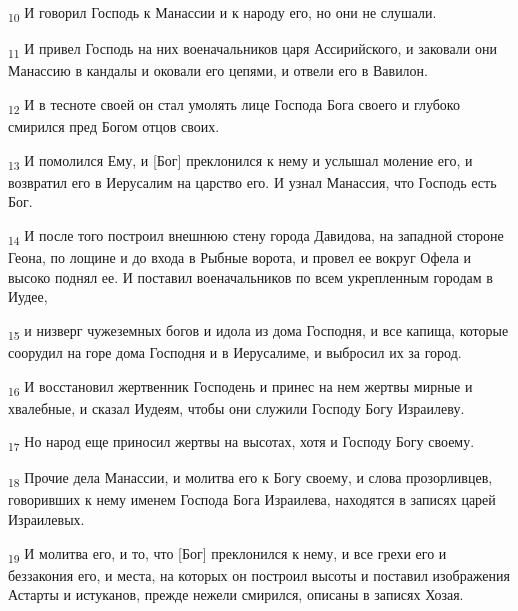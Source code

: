 \begin{tcolorbox}
\textsubscript{10} И говорил Господь к Манассии и к народу его, но они не слушали.
\end{tcolorbox}
\begin{tcolorbox}
\textsubscript{11} И привел Господь на них военачальников царя Ассирийского, и заковали они Манассию в кандалы и оковали его цепями, и отвели его в Вавилон.
\end{tcolorbox}
\begin{tcolorbox}
\textsubscript{12} И в тесноте своей он стал умолять лице Господа Бога своего и глубоко смирился пред Богом отцов своих.
\end{tcolorbox}
\begin{tcolorbox}
\textsubscript{13} И помолился Ему, и [Бог] преклонился к нему и услышал моление его, и возвратил его в Иерусалим на царство его. И узнал Манассия, что Господь есть Бог.
\end{tcolorbox}
\begin{tcolorbox}
\textsubscript{14} И после того построил внешнюю стену города Давидова, на западной стороне Геона, по лощине и до входа в Рыбные ворота, и провел ее вокруг Офела и высоко поднял ее. И поставил военачальников по всем укрепленным городам в Иудее,
\end{tcolorbox}
\begin{tcolorbox}
\textsubscript{15} и низверг чужеземных богов и идола из дома Господня, и все капища, которые соорудил на горе дома Господня и в Иерусалиме, и выбросил их за город.
\end{tcolorbox}
\begin{tcolorbox}
\textsubscript{16} И восстановил жертвенник Господень и принес на нем жертвы мирные и хвалебные, и сказал Иудеям, чтобы они служили Господу Богу Израилеву.
\end{tcolorbox}
\begin{tcolorbox}
\textsubscript{17} Но народ еще приносил жертвы на высотах, хотя и Господу Богу своему.
\end{tcolorbox}
\begin{tcolorbox}
\textsubscript{18} Прочие дела Манассии, и молитва его к Богу своему, и слова прозорливцев, говоривших к нему именем Господа Бога Израилева, находятся в записях царей Израилевых.
\end{tcolorbox}
\begin{tcolorbox}
\textsubscript{19} И молитва его, и то, что [Бог] преклонился к нему, и все грехи его и беззакония его, и места, на которых он построил высоты и поставил изображения Астарты и истуканов, прежде нежели смирился, описаны в записях Хозая.
\end{tcolorbox}
